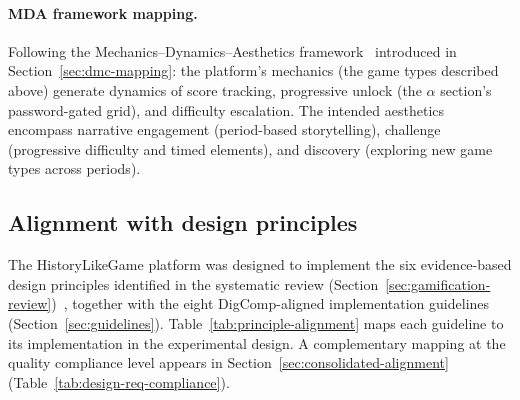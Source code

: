 \paragraph{MDA framework mapping.}
Following the Mechanics--Dynamics--Aesthetics framework~\cite{Hunicke2004} introduced in Section~\ref{sec:dmc-mapping}: the platform's mechanics (the game types described above) generate dynamics of score tracking, progressive unlock (the $\alpha$ section's password-gated grid), and difficulty escalation. The intended aesthetics encompass narrative engagement (period-based storytelling), challenge (progressive difficulty and timed elements), and discovery (exploring new game types across periods).

\subsection{Alignment with design principles}

The HistoryLikeGame platform was designed to implement the six evidence-based design principles identified in the systematic review (Section~\ref{sec:gamification-review})~\cite{KorniienkoSemerikov2024}, together with the eight DigComp-aligned implementation guidelines (Section~\ref{sec:guidelines}). Table~\ref{tab:principle-alignment} maps each guideline to its implementation in the experimental design. A complementary mapping at the quality compliance level appears in Section~\ref{sec:consolidated-alignment} (Table~\ref{tab:design-req-compliance}).

